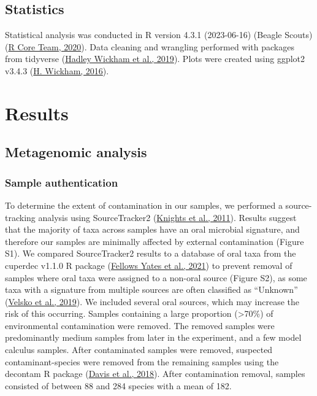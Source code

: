 \documentclass[
  letterpaper,
]{book}
\begin{document}
\hypertarget{statistics}{%
\subsection{Statistics}\label{statistics}}

Statistical analysis was conducted in R version 4.3.1 (2023-06-16)
(Beagle Scouts) (\protect\hyperlink{ref-Rbase}{R Core Team, 2020}). Data
cleaning and wrangling performed with packages from tidyverse
(\protect\hyperlink{ref-tidyverse2019}{Hadley Wickham et al., 2019}).
Plots were created using ggplot2 v3.4.3
(\protect\hyperlink{ref-ggplot2}{H. Wickham, 2016}).

\hypertarget{results}{%
\section{Results}\label{results}}

\hypertarget{metagenomic-analysis}{%
\subsection{Metagenomic analysis}\label{metagenomic-analysis}}

\hypertarget{sample-authentication}{%
\subsubsection{Sample authentication}\label{sample-authentication}}

To determine the extent of contamination in our samples, we performed a
source-tracking analysis using SourceTracker2
(\protect\hyperlink{ref-knightsSourceTracker2011}{Knights et al.,
2011}). Results suggest that the majority of taxa across samples have an
oral microbial signature, and therefore our samples are minimally
affected by external contamination (Figure S1). We compared
SourceTracker2 results to a database of oral taxa from the cuperdec
v1.1.0 R package
(\protect\hyperlink{ref-yatesOralMicrobiome2021}{Fellows Yates et al.,
2021}) to prevent removal of samples where oral taxa were assigned to a
non-oral source (Figure S2), as some taxa with a signature from multiple
sources are often classified as ``Unknown''
(\protect\hyperlink{ref-velskoMicrobialDifferences2019}{Velsko et al.,
2019}). We included several oral sources, which may increase the risk of
this occurring. Samples containing a large proportion (\textgreater70\%)
of environmental contamination were removed. The removed samples were
predominantly medium samples from later in the experiment, and a few
model calculus samples. After contaminated samples were removed,
suspected contaminant-species were removed from the remaining samples
using the decontam R package (\protect\hyperlink{ref-Rdecontam}{Davis et
al., 2018}). After contamination removal, samples consisted of between
88 and 284 species with a mean of 182.
\end{document}
